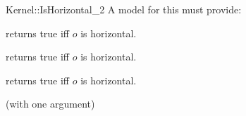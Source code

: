 \begin{ccRefFunctionObjectConcept}{Kernel::IsHorizontal_2}
A model for this must provide:


{returns true iff $o$ is horizontal.}

{returns true iff $o$ is horizontal.}

{returns true iff $o$ is horizontal.}

\ccRefines
{} (with one argument)

\ccSeeAlso
{} \\
 \\
 \\

\end{ccRefFunctionObjectConcept}
